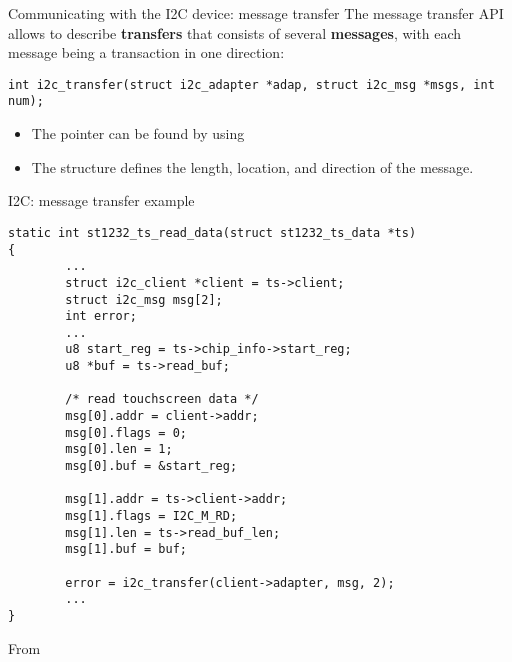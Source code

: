 \begin{frame}[fragile]{Communicating with the I2C device: message transfer}
  The message transfer API allows to describe {\bf transfers} that
  consists of several {\bf messages}, with each message being a
  transaction in one direction:
  \begin{block}{}
    \begin{verbatim}
int i2c_transfer(struct i2c_adapter *adap, struct i2c_msg *msgs, int num);
    \end{verbatim}
  \end{block}
  \begin{itemize}
  \item The  pointer can be found by using
  \item The  structure defines the length, location, and
    direction of the message.
  \end{itemize}
\end{frame}

\begin{frame}[fragile]{I2C: message transfer example}
\begin{block}{}
  \begin{verbatim}
static int st1232_ts_read_data(struct st1232_ts_data *ts)
{
        ...
        struct i2c_client *client = ts->client;
        struct i2c_msg msg[2];
        int error;
        ...
        u8 start_reg = ts->chip_info->start_reg;
        u8 *buf = ts->read_buf;

        /* read touchscreen data */
        msg[0].addr = client->addr;
        msg[0].flags = 0;
        msg[0].len = 1;
        msg[0].buf = &start_reg;

        msg[1].addr = ts->client->addr;
        msg[1].flags = I2C_M_RD;
        msg[1].len = ts->read_buf_len;
        msg[1].buf = buf;

        error = i2c_transfer(client->adapter, msg, 2);
        ...
}
\end{verbatim}
\end{block}
From 
\end{frame}

